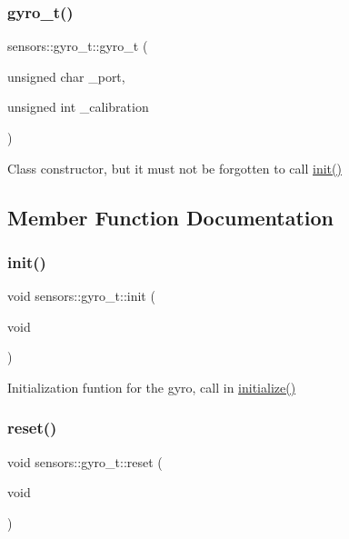 \subsubsection{\texorpdfstring{gyro\+\_\+t()}{gyro\_t()}}
{\footnotesize\ttfamily sensors\+::gyro\+\_\+t\+::gyro\+\_\+t (\begin{DoxyParamCaption}\item[{unsigned char}]{\+\_\+port,  }\item[{unsigned int}]{\+\_\+calibration }\end{DoxyParamCaption})}

Class constructor, but it must not be forgotten to call \hyperlink{classsensors_1_1gyro__t_a01d25ac8eb835e284da8ae7842262619}{init()} 

\subsection{Member Function Documentation}
\mbox{\label{classsensors_1_1gyro__t_a01d25ac8eb835e284da8ae7842262619}} 
\subsubsection{\texorpdfstring{init()}{init()}}
{\footnotesize\ttfamily void sensors\+::gyro\+\_\+t\+::init (\begin{DoxyParamCaption}\item[{void}]{ }\end{DoxyParamCaption})}

Initialization funtion for the gyro, call in \hyperlink{main_8h_a25a40b6614565f755233080a384c35f1}{initialize()} \mbox{\label{classsensors_1_1gyro__t_a5616b7066c0eb535866f51fa55a7e22b}} 
\subsubsection{\texorpdfstring{reset()}{reset()}}
{\footnotesize\ttfamily void sensors\+::gyro\+\_\+t\+::reset (\begin{DoxyParamCaption}\item[{void}]{ }\end{DoxyParamCaption})}

